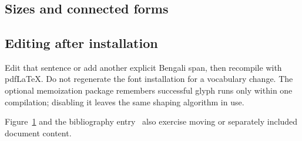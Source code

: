 \section{}\label{sec:results}

\subsection*{Sizes and connected forms}
{\small{}\par}
{\normalsize{}\par}
{\large{}\par}

\begin{figure}[ht]
\centering
{}
\caption{}\label{fig:example}
\end{figure}

\subsection*{Editing after installation}

Edit that sentence or add another explicit Bengali span, then recompile with
pdfLaTeX. Do not regenerate the font installation for a vocabulary change.
The optional memoization package remembers successful glyph runs only within
one compilation; disabling it leaves the same shaping algorithm in use.

Figure~\ref{fig:example} and the bibliography entry~\cite{demo} also exercise
moving or separately included document content.
